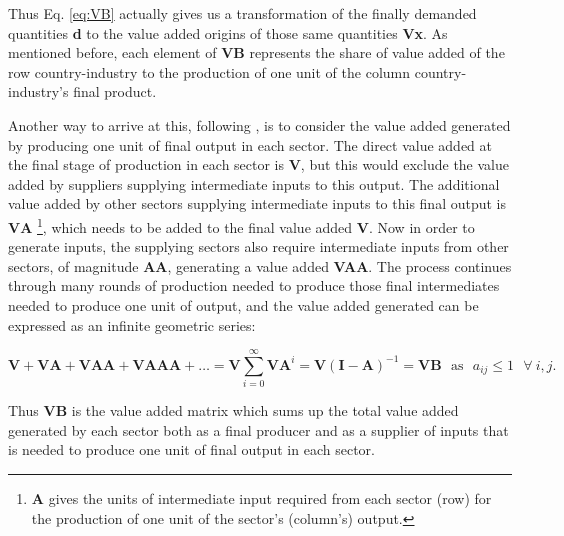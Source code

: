 \documentclass[a4paper]{article}
\begin{document}
Thus Eq. \ref{eq:VB} actually gives us a transformation of the finally demanded quantities \textbf{d} to the value added origins of those same quantities \textbf{Vx}. As mentioned before, each element of \textbf{VB} represents the share of value added of the row country-industry to the production of one unit of the column country-industry's final product.  \newline


Another way to arrive at this, following \citet{wang2013quantifying}, is to consider the value added generated by producing one unit of final output in each sector. The direct value added at the final stage of production in each sector is \textbf{V}, but this would exclude the value added by suppliers supplying intermediate inputs to this output. The additional value added by other sectors supplying intermediate inputs to this final output is $\textbf{V}\textbf{A}$ \footnote{\textbf{A} gives the units of intermediate input required from each sector (row) for the production of one unit of the sector's (column's) output.}, which needs to be added to the final value added \textbf{V}. 
Now in order to generate inputs, the supplying sectors also require intermediate inputs from other sectors, of magnitude \textbf{AA}, generating a value added \textbf{VAA}.  The process continues through many rounds of production needed to produce those final intermediates needed to produce one unit of output, and the value added generated can be expressed as an infinite geometric series:

\begin{equation}
\textbf{V} +\textbf{VA} + \textbf{VAA}+ \textbf{VAAA} + \dots = \textbf{V} \sum_{i=0}^\infty \textbf{VA}^i = \textbf{V}(\textbf{I}-\textbf{A})^{-1} = \textbf{VB}\ \ \ \text{as}\ \ \ a_{ij} \leq 1\ \ \ \forall\ i,j.
\end{equation}

Thus \textbf{VB} is the value added matrix which sums up the total value added generated by each sector both as a final producer and as a supplier of inputs that is needed to produce one unit of final output in each sector.  \newline

\end{document}
